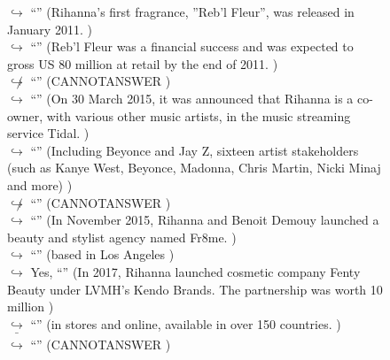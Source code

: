 \documentclass[11pt,a4paper, onecolumn]{article}
\begin{document}
\begin{figure}[t] \small \begin{tcolorbox}[boxsep=0pt,left=5pt,right=0pt,top=2pt,colback = yellow!5] \begin{dialogue}
 \small 
\colorbox{pink!25}{$\hookrightarrow$}
{ ``'' (Rihanna's first fragrance, ''Reb'l Fleur'', was released in January 2011. ) }
\\
\colorbox{pink!25}{$\hookrightarrow$}
{ ``'' (Reb'l Fleur was a financial success and was expected to gross US 80 million at retail by the end of 2011. ) }
\\
\colorbox{pink!25}{$\not\hookrightarrow$}
{ ``'' (CANNOTANSWER ) }
\\
\colorbox{pink!25}{$\hookrightarrow$}
{ ``'' (On 30 March 2015, it was announced that Rihanna is a co-owner, with various other music artists, in the music streaming service Tidal. ) }
\\
\colorbox{pink!25}{$\hookrightarrow$}
{ ``'' (Including Beyonce and Jay Z, sixteen artist stakeholders (such as Kanye West, Beyonce, Madonna, Chris Martin, Nicki Minaj and more) ) }
\\
\colorbox{pink!25}{$\not\hookrightarrow$}
{ ``'' (CANNOTANSWER ) }
\\
\colorbox{pink!25}{$\hookrightarrow$}
{ ``'' (In November 2015, Rihanna and Benoit Demouy launched a beauty and stylist agency named Fr8me. ) }
\\
\colorbox{pink!25}{$\hookrightarrow$}
{ ``'' (based in Los Angeles ) }
\\
\colorbox{pink!25}{$\hookrightarrow$}
\colorbox{red!25}{Yes,}
{ ``'' (In 2017, Rihanna launched cosmetic company Fenty Beauty under LVMH's Kendo Brands. The partnership was worth  10 million ) }
\\
\colorbox{pink!25}{$\hookrightarrow$}
{ ``'' (in stores and online, available in over 150 countries. ) }
\\
\colorbox{pink!25}{ $\bar{\hookrightarrow}$}
{ ``'' (CANNOTANSWER ) }
\\
 \end{dialogue}\end{tcolorbox}\end{figure}
\end{document}
